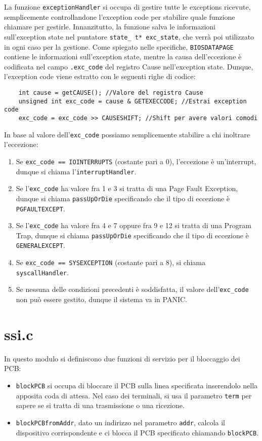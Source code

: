\documentclass[a4paper]{article}
\begin{document}
La funzione \verb+exceptionHandler+ si occupa di gestire tutte le exceptions ricevute, semplicemente controllandone l'exception code per stabilire quale funzione chiamare per gestirle. Innanzitutto, la funzione salva le informazioni sull'exception state nel puntatore \verb+state_ t* exc_state+, che verrà poi utilizzato in ogni caso per la gestione. Come spiegato nelle specifiche, \verb+BIOSDATAPAGE+ contiene le informazioni sull'exception state, mentre la causa dell'eccezione è codificata nel campo \verb+.exc_code+ del registro Cause nell'exception state. Dunque, l'exception code viene estratto con le seguenti righe di codice:
\begin{verbatim}
	int cause = getCAUSE(); //Valore del registro Cause
	unsigned int exc_code = cause & GETEXECCODE; //Estrai exception code
	exc_code = exc_code >> CAUSESHIFT; //Shift per avere valori comodi
\end{verbatim}
In base al valore dell'\verb+exc_code+ possiamo semplicemente stabilire a chi inoltrare l'eccezione:
\begin{enumerate}
\item Se \verb+exc_code == IOINTERRUPTS+ (costante pari a 0), l'eccezione è un'interrupt, dunque si chiama l'\verb+interruptHandler+.
\item Se l'\verb+exc_code+ ha valore fra 1 e 3 si tratta di una Page Fault Exception, dunque si chiama \verb+passUpOrDie+ specificando che il tipo di eccezione è \verb+PGFAULTEXCEPT+.
\item Se l'\verb+exc_code+ ha valore fra 4 e 7 oppure fra 9 e 12 si tratta di una Program Trap, dunque si chiama \verb+passUpOrDie+ specificando che il tipo di eccezione è \verb+GENERALEXCEPT+.
\item Se \verb+exc_code == SYSEXCEPTION+ (costante pari a 8), si chiama \verb+syscallHandler+.
\item Se nessuna delle condizioni precedenti è soddisfatta, il valore dell'\verb+exc_code+ non può essere gestito, dunque il sistema va in PANIC.
\end{enumerate} 

\section{ssi.c}
In questo modulo si definiscono due funzioni di servizio per il bloccaggio dei PCB:
\begin{itemize}
\item \verb+blockPCB+ si occupa di bloccare il PCB sulla linea specificata inserendolo nella apposita coda di attesa. Nel caso dei terminali, si usa il parametro \verb+term+ per sapere se si tratta di una trasmissione o una ricezione.
\item \verb+blockPCBfromAddr+, dato un indirizzo nel parametro \verb+addr+, calcola il dispositivo corrispondente e ci blocca il PCB specificato chiamando \verb+blockPCB+.
\end{itemize}
\end{document}
